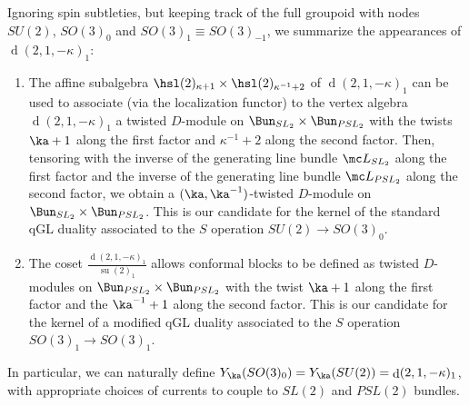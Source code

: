 \documentclass[11pt,reqno]{amsart}
\theoremstyle{plain}
\numberwithin{equation}{section}
\DeclareMathOperator{\td}{d}
\DeclareMathOperator{\tsu}{su}
\theoremstyle{definition}
\begin{document}
Ignoring spin subtleties, but keeping
track of the full groupoid with nodes $SU(2)$, $SO(3)_0$ and
$SO(3)_1 \equiv SO(3)_{-1}$, we summarize the appearances of $\td(2,1,-\kappa)_1$:

\begin{enumerate}
\item The affine subalgebra $\hsl(2)_{\kappa+1} \times
  \hsl(2)_{\kappa^{-1}+2}$ of $\td(2,1,-\kappa)_1$ can be used to
  associate (via the localization functor) to the vertex
  algebra $\td(2,1,-\kappa)_1$ a twisted $D$-module on $\Bun_{SL_2}
  \times \Bun_{PSL_2}$ with the twists $\ka+1$ along the first factor
  and $\kappa^{-1}+2$ along the second factor. Then, tensoring with
  the inverse of the generating line bundle ${\mc L}_{SL_2}$ along the
  first factor and the inverse of the generating line bundle ${\mc
    L}_{PSL_2}$ along the second factor, we obtain a
  $(\ka,\ka^{-1})$-twisted $D$-module on $\Bun_{SL_2} \times
  \Bun_{PSL_2}$. This is our candidate for the kernel of the standard
  qGL duality associated to the $S$ operation $SU(2) \to SO(3)_0$.

\item The coset $\frac{\td(2,1,-\kappa)_1}{\tsu(2)_1}$ allows
  conformal blocks to be defined as twisted $D$-modules on
  $\Bun_{PSL_2} \times \Bun_{PSL_2}$ with the twist $\ka+1$ along the
  first factor and the $\ka^{-1}+1$ along the second factor. This is
  our candidate for the kernel of a modified qGL duality associated
  to the $S$ operation $SO(3)_1 \to SO(3)_1$.
\end{enumerate}

In particular, we can naturally define $Y_\ka(SO(3)_0) = Y_\ka(SU(2))=\td(2,1,-\kappa)_1$,
with appropriate choices of currents to couple to $SL(2)$ and $PSL(2)$ bundles. 
\end{document}
